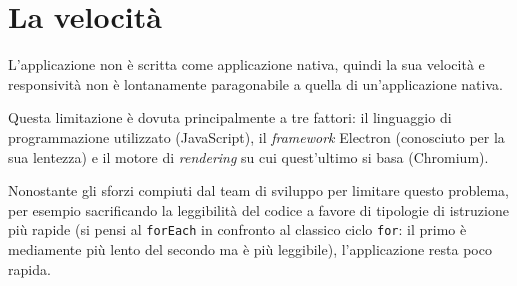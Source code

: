 \section{La velocità}
L'applicazione non è scritta come applicazione nativa, quindi la sua velocità e
responsività non è lontanamente paragonabile a quella di un'applicazione nativa.

Questa limitazione è dovuta principalmente a tre fattori: il linguaggio di
programmazione utilizzato (JavaScript), il \textit{framework} Electron
(conosciuto per la sua lentezza) e il motore di \textit{rendering} su cui
quest'ultimo si basa (Chromium).

Nonostante gli sforzi compiuti dal team di sviluppo per limitare questo
problema, per esempio sacrificando la leggibilità del codice a favore di
tipologie di istruzione più rapide (si pensi al \lstinline|forEach| in confronto
al classico ciclo \lstinline|for|: il primo è mediamente più lento del secondo
ma è più leggibile), l'applicazione resta poco rapida.